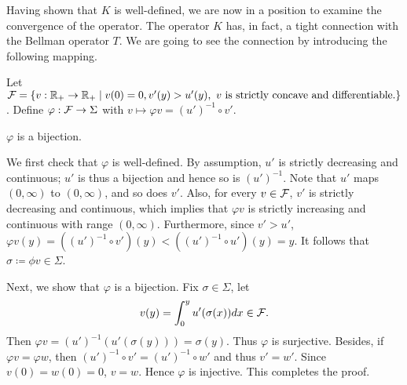 \documentclass[12pt]{article}
\begin{document}
Having shown that $K$ is well-defined, we are now in a position 
to examine the convergence of the operator. The operator $K$ has, 
in fact, a tight connection with the Bellman operator $T$. 
We are going to see the connection by introducing the following 
mapping. 

\begin{definition}
    Let $\mathcal{F} = \left\{ v:\mathbb{R}_+ \to\mathbb{R}_+ \;\middle\vert\; v(0) = 0, v'(y)>u'(y), 
    \text{ $v$ is strictly concave and differentiable.} \right\}$. 
    Define $\varphi:\mathcal{F} \to\Sigma$ with 
    $v\mapsto \varphi v = (u')^{-1}\circ v'$.
\end{definition}
\begin{proposition}
    $\varphi$ is a bijection.
\end{proposition}
\begin{pf}
    We first check that $\varphi$ is well-defined. By 
    assumption, $u'$ is strictly decreasing and continuous; 
    $u'$ is thus a bijection and hence so is $(u')^{-1}$. Note 
    that $u'$ maps $(0, \infty)$ to $(0, \infty)$, and so 
    does $v'$. Also, for every $v\in\mathcal{F}$, $v'$ is strictly 
    decreasing and continuous, which implies that $\varphi v$ 
    is strictly increasing and continuous with range 
    $(0, \infty)$. Furthermore, since $v'>u'$, $\varphi v(y) 
    = ((u')^{-1}\circ v')(y)<((u')^{-1}\circ u')(y) = y$. It 
    follows that $\sigma\coloneqq\phi v\in\Sigma$. 

    Next, we show that $\varphi$ is a bijection. Fix 
    $\sigma\in\Sigma$, let 
    \begin{equation}
        v(y) = \int_{0}^{y} u'(\sigma(x)) dx \in \mathcal{F}.
    \end{equation}
    Then $\varphi v = (u')^{-1}(u'(\sigma(y))) = \sigma(y)$. 
    Thus $\varphi$ is surjective. Besides, if $\varphi v = 
    \varphi w$, then $(u')^{-1}\circ v' = (u')^{-1}\circ w'$ 
    and thus $v' = w'$. Since $v(0) = w(0) = 0$, $v = w$. 
    Hence $\varphi$ is injective. This completes the proof. 
\end{pf}
\end{document}
